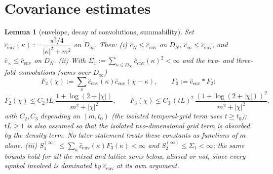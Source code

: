 \documentclass[11pt,a4paper]{article}
\theoremstyle{plain}
\newtheorem{lemma}[theorem]{Lemma}
\theoremstyle{definition}
\begin{document}
\section{Covariance estimates}\label{sec:covest}

\begin{lemma}[envelope, decay of convolutions, summability]\label{lem:envelope}
Set $\hat c_{\mathrm{env}}(\kappa):=\dfrac{\pi^2/4}{|\kappa|^2+m^2}$ on
$D_\infty$. Then:
\emph{(i)} $\hat c_N\le\hat c_{\mathrm{env}}$ on $D_N$,
$\hat c_\infty\le\hat c_{\mathrm{env}}$, and
$\hat c_\times\le\hat c_{\mathrm{env}}$ on $D_N$.
\emph{(ii)} With $\Sigma_1:=\sum_{\kappa\in D_\infty}
\hat c_{\mathrm{env}}(\kappa)^2<\infty$ and the two- and three-fold
convolutions (sums over $D_\infty$)
\[
 F_2(\chi):=\sum_{\kappa}\hat c_{\mathrm{env}}(\kappa)
 \hat c_{\mathrm{env}}(\chi-\kappa),
 \qquad
 F_3:=\hat c_{\mathrm{env}}*F_2 :
\]
\begin{equation}
 F_2(\chi)\le C_2\,tL\;\frac{1+\log(2+|\chi|)}{m^2+|\chi|^2},
 \qquad
 F_3(\chi)\le C_3\,(tL)^2\,\frac{(1+\log(2+|\chi|))^2}{m^2+|\chi|^2},
 \label{eq:convdecay}
\end{equation}
with $C_2,C_3$ depending on $(m,t_0)$ (the isolated temporal-grid term uses
$t\ge t_0$); $tL\ge1$ is also assumed so that the isolated two-dimensional
grid term is absorbed by the density term.  No later statement treats these
constants as functions of $m$ alone.
\emph{(iii)} $S_4^{(\infty)}\le\sum_{\kappa}\hat c_{\mathrm{env}}(\kappa)
F_3(\kappa)<\infty$ and
$S_2^{(\infty)}\le\Sigma_1<\infty$; the same bounds hold for all the mixed
and lattice sums below, aliased or not, since every symbol involved is
dominated by $\hat c_{\mathrm{env}}$ at its own argument.
\end{lemma}
\end{document}
